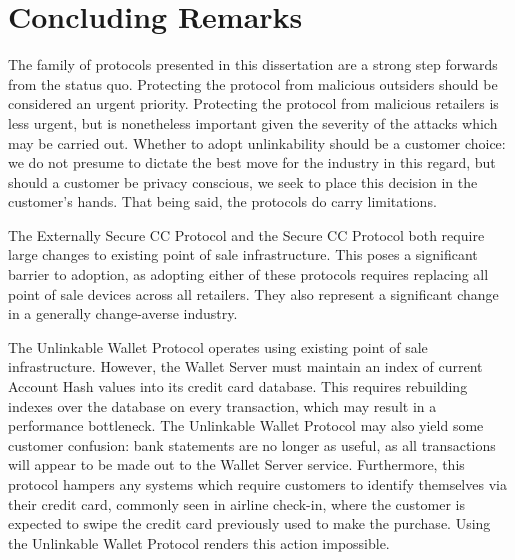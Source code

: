 \section{Concluding Remarks}

The family of protocols presented in this dissertation are a strong step forwards from the status quo.
Protecting the protocol from malicious outsiders should be considered an urgent priority.
Protecting the protocol from malicious retailers is less urgent, but is nonetheless important given the severity of the attacks which may be carried out.
Whether to adopt unlinkability should be a customer choice:
    we do not presume to dictate the best move for the industry in this regard, but should a customer be privacy conscious, we seek to place this decision in the customer's hands.
That being said, the protocols do carry limitations.

The Externally Secure CC Protocol and the Secure CC Protocol both require large changes to existing point of sale infrastructure.
This poses a significant barrier to adoption, as adopting either of these protocols requires replacing all point of sale devices across all retailers.
They also represent a significant change in a generally change-averse industry.

The Unlinkable Wallet Protocol operates using existing point of sale infrastructure.
However, the Wallet Server must maintain an index of current Account Hash values into its credit card database.
This requires rebuilding indexes over the database on every transaction, which may result in a performance bottleneck.
The Unlinkable Wallet Protocol may also yield some customer confusion:
    bank statements are no longer as useful, as all transactions will appear to be made out to the Wallet Server service.
Furthermore, this protocol hampers any systems which require customers to identify themselves via their credit card,
    commonly seen in airline check-in, where the customer is expected to swipe the credit card previously used to make the purchase.
Using the Unlinkable Wallet Protocol renders this action impossible.